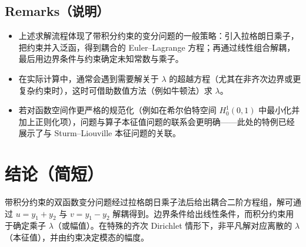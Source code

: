 \documentclass[11pt]{article}
\begin{document}
\subsection*{ Remarks（说明）}
\begin{itemize}
  \item 上述求解流程体现了带积分约束的变分问题的一般策略：引入拉格朗日乘子，把约束并入泛函，得到耦合的 Euler--Lagrange 方程；再通过线性组合解耦，最后用边界条件与约束确定未知常数与乘子。
  \item 在实际计算中，通常会遇到需要解关于 \(\lambda\) 的超越方程（尤其在非齐次边界或更复杂约束时），这时可借助数值方法（例如牛顿法）求 \(\lambda\)。
  \item 若对函数空间作更严格的规范化（例如在希尔伯特空间 $H_0^1(0,1)$ 中最小化并加上正则化项），问题与算子本征值问题的联系会更明确——此处的特例已经展示了与 Sturm--Liouville 本征问题的关联。
\end{itemize}

\section*{结论（简短）}
带积分约束的双函数变分问题经过拉格朗日乘子法后给出耦合二阶方程组，解可通过 $u=y_1+y_2$ 与 $v=y_1-y_2$ 解耦得到。边界条件给出线性条件，而积分约束用于确定乘子 \(\lambda\)（或幅值）。在特殊的齐次 Dirichlet 情形下，非平凡解对应离散的 \(\lambda\)（本征值），并由约束决定模态的幅度。
\end{document}
